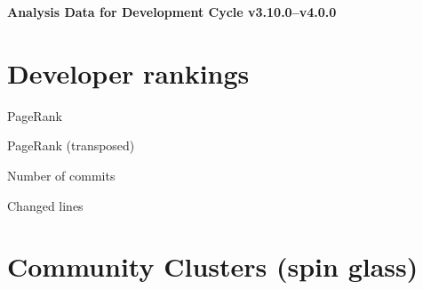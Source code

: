 \documentclass{article}
\begin{document}
\setlength{\parindent}{0pt}
\begin{center}
\begin{Large}
\textbf{Analysis Data for Development Cycle v3.10.0--v4.0.0}
\end{Large}
\end{center}
\section{Developer rankings}
\begin{small}\renewcommand{\tabcolsep}{1pt}
\begin{minipage}{0.5\linewidth}
PageRank\\

\end{minipage}%
\begin{minipage}{0.5\linewidth}
PageRank (transposed)\\

\end{minipage}

\renewcommand{\tabcolsep}{5pt}
\begin{minipage}{0.5\linewidth}
Number of commits\\

\end{minipage}%
\begin{minipage}{0.5\linewidth}
Changed lines\\

\end{minipage}
\end{small}
\newpage\section{Community Clusters (spin glass)}
\end{document}
